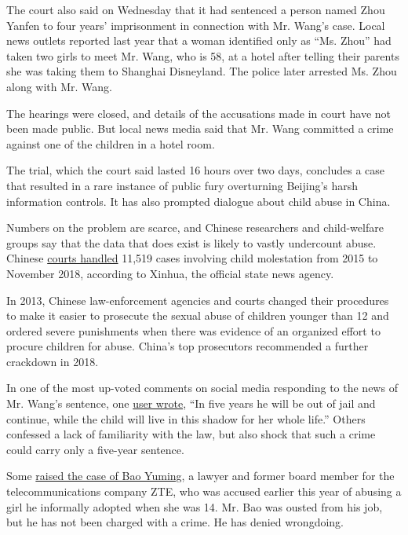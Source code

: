 The court also said on Wednesday that it had sentenced a person named
Zhou Yanfen to four years' imprisonment in connection with Mr. Wang's
case. Local news outlets reported last year that a woman identified only
as ``Ms. Zhou'' had taken two girls to meet Mr. Wang, who is 58, at a
hotel after telling their parents she was taking them to Shanghai
Disneyland. The police later arrested Ms. Zhou along with Mr. Wang.

The hearings were closed, and details of the accusations made in court
have not been made public. But local news media said that Mr. Wang
committed a crime against one of the children in a hotel room.

The trial, which the court said lasted 16 hours over two days, concludes
a case that resulted in a rare instance of public fury overturning
Beijing's harsh information controls. It has also prompted dialogue
about child abuse in China.

Numbers on the problem are scarce, and Chinese researchers and
child-welfare groups say that the data that does exist is likely to
vastly undercount abuse. Chinese
\href{http://www.xinhuanet.com/2018-12/25/c_1123901403.htm}{courts
handled} 11,519 cases involving child molestation from 2015 to November
2018, according to Xinhua, the official state news agency.

In 2013, Chinese law-enforcement agencies and courts changed their
procedures to make it easier to prosecute the sexual abuse of children
younger than 12 and ordered severe punishments when there was evidence
of an organized effort to procure children for abuse. China's top
prosecutors recommended a further crackdown in 2018.

In one of the most up-voted comments on social media responding to the
news of Mr. Wang's sentence, one
\href{https://www.weibo.com/2656274875/J73sIaaSD?refer_flag=1001030103_\&type=comment\#_rnd1592388931688}{user
wrote}, ``In five years he will be out of jail and continue, while the
child will live in this shadow for her whole life.'' Others confessed a
lack of familiarity with the law, but also shock that such a crime could
carry only a five-year sentence.

Some
\href{https://www.nytimes.com/2020/04/13/world/asia/china-metoo.html}{raised
the case of Bao Yuming}, a lawyer and former board member for the
telecommunications company ZTE, who was accused earlier this year of
abusing a girl he informally adopted when she was 14. Mr. Bao was ousted
from his job, but he has not been charged with a crime. He has denied
wrongdoing.

